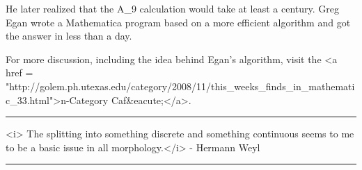 He later realized that the A_{9} calculation would take at least
a century.  Greg Egan wrote a Mathematica program based on a more
efficient algorithm and got the answer in less than a day.

For more discussion, including the idea behind Egan's algorithm,
visit the <a href = "http://golem.ph.utexas.edu/category/2008/11/this_weeks_finds_in_mathematic_33.html">n-Category Caf&eacute;</a>.

\par\noindent\rule{\textwidth}{0.4pt}
<i>
The splitting into something discrete and something continuous
seems to me to be a basic issue in all morphology.</i> - Hermann Weyl

\par\noindent\rule{\textwidth}{0.4pt}

